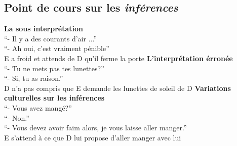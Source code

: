 \subsection{Point de cours sur les \emph{inférences}}
\textbf{La sous interprétation}\\
\enquote{- Il y a des courants d'air ...}\\
\enquote{- Ah oui, c'est vraiment pénible}\\
   E a froid et attends de D qu'il ferme la porte
\textbf{L'interprétation érronée}\\
\enquote{- Tu ne mets pas tes lunettes?}\\
\enquote{- Si, tu as raison.}\\
   D n'a pas compris que E demande les lunettes de soleil de D
\textbf{Variations culturelles sur les inférences}\\
\enquote{- Vous avez mangé?}\\
\enquote{- Non.}\\
\enquote{- Vous devez avoir faim alors, je vous laisse aller manger.}\\
   E s'attend à ce que D lui propose d'aller manger avec lui



